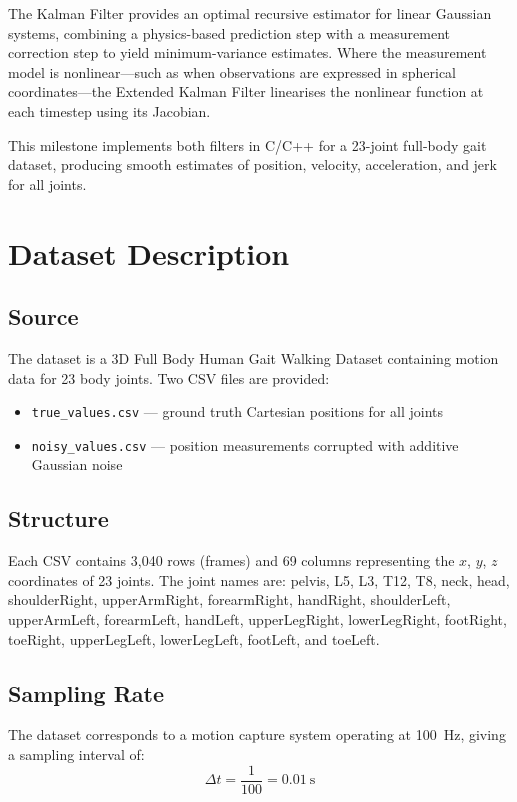 \documentclass[12pt,a4paper]{article}
\begin{document}
The Kalman Filter provides an optimal recursive estimator for linear Gaussian systems,
combining a physics-based prediction step with a measurement correction step to yield
minimum-variance estimates. Where the measurement model is nonlinear—such as when
observations are expressed in spherical coordinates—the Extended Kalman Filter linearises
the nonlinear function at each timestep using its Jacobian.

This milestone implements both filters in C/C++ for a 23-joint full-body gait dataset,
producing smooth estimates of position, velocity, acceleration, and jerk for all joints.

\section{Dataset Description}

\subsection{Source}
The dataset is a 3D Full Body Human Gait Walking Dataset containing motion data for
23 body joints. Two CSV files are provided:
\begin{itemize}[noitemsep]
    \item \texttt{true\_values.csv} — ground truth Cartesian positions for all joints
    \item \texttt{noisy\_values.csv} — position measurements corrupted with additive Gaussian noise
\end{itemize}

\subsection{Structure}
Each CSV contains 3{,}040 rows (frames) and 69 columns representing the $x$, $y$, $z$
coordinates of 23 joints. The joint names are: pelvis, L5, L3, T12, T8, neck, head,
shoulderRight, upperArmRight, forearmRight, handRight, shoulderLeft, upperArmLeft,
forearmLeft, handLeft, upperLegRight, lowerLegRight, footRight, toeRight, upperLegLeft,
lowerLegLeft, footLeft, and toeLeft.

\subsection{Sampling Rate}
The dataset corresponds to a motion capture system operating at 100~Hz, giving a
sampling interval of:
\[
    \Delta t = \frac{1}{100} = 0.01 \ \text{s}
\]
\end{document}
